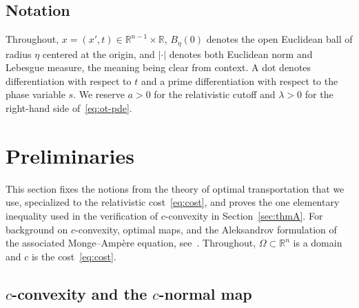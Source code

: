 \documentclass[12pt,letterpaper]{amsart}
\theoremstyle{definition}
\theoremstyle{plain}
\numberwithin{equation}{section}
\newcommand{\R}{\mathbb{R}}
\newcommand{\Om}{\Omega}
\begin{document}
\subsection*{Notation}
Throughout, $x=(x',t)\in\R^{n-1}\times\R$, $B_\eta(0)$ denotes the open Euclidean ball of
radius $\eta$ centered at the origin, and $|\cdot|$ denotes both Euclidean norm and Lebesgue
measure, the meaning being clear from context.
A dot denotes differentiation with respect to $t$ and a prime differentiation with respect to
the phase variable $s$.
We reserve $a>0$ for the relativistic cutoff and $\lambda>0$
for the right-hand side of~\eqref{eq:ot-pde}.


























\section{Preliminaries}\label{sec:prelim}

This section fixes the notions from the theory of optimal transportation that we use,
specialized to the relativistic cost~\eqref{eq:cost}, and proves the one elementary inequality used in the verification of $c$-convexity in Section~\ref{sec:thmA}. For background on
$c$-convexity, optimal maps, and the Aleksandrov formulation of the associated
Monge--Amp\`ere equation, see~\cite{Vi09,Fi17}.
Throughout, $\Om\subset\R^n$ is a domain and $c$ is the cost~\eqref{eq:cost}.

\subsection{\texorpdfstring{$c$}{c}-convexity and the \texorpdfstring{$c$}{c}-normal map}
\end{document}
